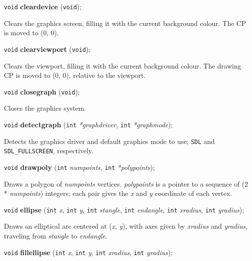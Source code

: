 \documentclass[a4paper,11pt]{article}
\newcommand{\V}{\texttt{void}}      %
\newcommand{\I}{\texttt{int}}       %
\newcommand{\func}[1]{\textbf{#1}}  %
\newcommand{\A}[1]{\emph{#1}}       %
\newcommand{\T}[1]{\texttt{#1}}     %
\newenvironment{bgi}
{ %
  \begin{snugshade}
}
{ %
  \end{snugshade}
}
\begin{document}

\begin{bgi}
\V{} \func{cleardevice} (\V{});
\end{bgi}

Clears the graphics screen, filling it with the current background
colour. The CP is moved to (0, 0).


\begin{bgi}
\V{} \func{clearviewport} (\V{});
\end{bgi}

Clears the viewport, filling it with the current background colour.
The drawing CP is moved to (0, 0), relative to the viewport.


\begin{bgi}
\V{} \func{closegraph} (\V{});
\end{bgi}

Closes the graphics system.


\begin{bgi}
\V{} \func{detectgraph} (\I{} \A{*graphdriver}, \I{} \A{*graphmode});
\end{bgi}

Detects the graphics driver and default graphics mode to use; \T{SDL}
and \T{SDL\_FULLSCREEN}, respectively.


\begin{bgi}
\V{} \func{drawpoly} (\I{} \A{numpoints}, \I{} \A{*polypoints});
\end{bgi}

Draws a polygon of \A{numpoints} vertices. \A{polypoints} is a
pointer to a sequence of (2 * \A{numpoints}) integers; each pair gives
the \A{x} and \A{y} coordinate of each vertex.


\begin{bgi}
\V{} \func{ellipse} (\I{} \A{x}, \I{} \A{y}, \I{} \A{stangle}, \I{}
\A{endangle}, \I{} \A{xradius}, \I{} \A{yradius});
\end{bgi}

Draws an elliptical arc centered at (\A{x}, \A{y}), with axes given by
\A{xradius} and \A{yradius}, traveling from \A{stangle} to
\A{endangle}.


\begin{bgi}
\V{} \func{fillellipse} (\I{} \A{x}, \I{} \A{y}, \I{} \A{xradius},
\I{} \A{yradius});
\end{bgi}
\end{document}

